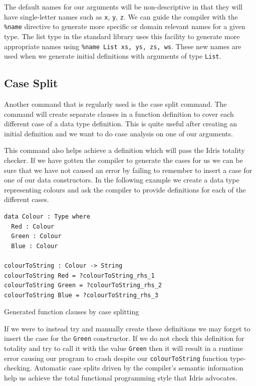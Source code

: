 \documentclass[a4paper, notitlepage]{report}
\begin{document}
The default names for our arguments will be non-descriptive in that they will
have single-letter names such as \texttt{x}, \texttt{y}, \texttt{z}. We can guide the compiler with the
\texttt{\%name} directive to generate more specific or domain relevant names for a given
type. The list type in the standard library uses this facility to generate more
appropriate names using \texttt{\%name List xs, ys, zs, ws}. These new names are used when
we generate initial definitions with arguments of type \texttt{List}.

\subsection{Case Split}
\label{sec:org0122083}
Another command that is regularly used is the case split command. The command
will create separate clauses in a function definition to cover each different
case of a data type definition. This is quite useful after creating an initial
definition and we want to do case analysis on one of our arguments.

This command also helps achieve a definition which will pass the Idris totality
checker. If we have gotten the compiler to generate the cases for us we can be
sure that we have not caused an error by failing to remember to insert a case
for one of our data constructors. In the following example we create a data type
representing colours and ask the compiler to provide definitions for each of the
different cases.

\begin{listing}[H]
\begin{verbatim}
data Colour : Type where
  Red : Colour
  Green : Colour
  Blue : Colour

colourToString : Colour -> String
colourToString Red = ?colourToString_rhs_1
colourToString Green = ?colourToString_rhs_2
colourToString Blue = ?colourToString_rhs_3
\end{verbatim}
\caption{Generated function clauses by case splitting}
\end{listing}

If we were to instead try and manually create these definitions we may forget to
insert the case for the \texttt{Green} constructor. If we do not check this definition
for totality and try to call it with the value \texttt{Green} then it will result in a
runtime error causing our program to crash despite our \texttt{colourToString} function
type-checking. Automatic case splits driven by the compiler's semantic
information help us achieve the total functional programming style that Idris
advocates.
\end{document}

